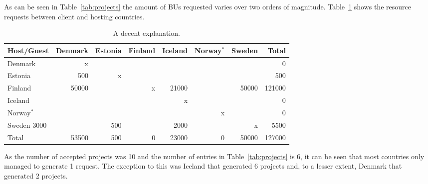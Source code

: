As can be seen in Table~\ref{tab:projects} the amount of BUs requested varies over two orders of magnitude.
Table~\ref{tab:results} shows the resource requests between client and hosting countries.
\begin{table}[ht]
\begin{center}
\begin{tabular}{|l|r|r|r|r|r|r|r|} \hline
\bf Host/Guest &Denmark &Estonia &Finland &Iceland &Norway$^*$ &Sweden &Total \\\hline
Denmark & x & & & & & & 0 \\
Estonia & 500 & x & & & & & 500 \\
Finland & 50000 & & x & 21000 & & 50000 & 121000 \\
Iceland & & & & x & & & 0 \\
Norway$^*$  & & & & & x & & 0 \\
Sweden  3000 & & 500 & & 2000 & & x & 5500 \\
\hline
Total & 53500 & 500 & 0 & 23000 & 0 & 50000 & 127000 \\ \hline
\end{tabular}
\caption{A decent explanation. \label{tab:results}}
\end{center}
\end{table}

As the number of accepted projects was 10 and the number of entries in Table~\ref{tab:projects} is 6, it can be seen that most countries only managed to generate 1 request.
The exception to this was Iceland that generated 6 projects and, to a lesser extent, Denmark that generated 2 projects.
